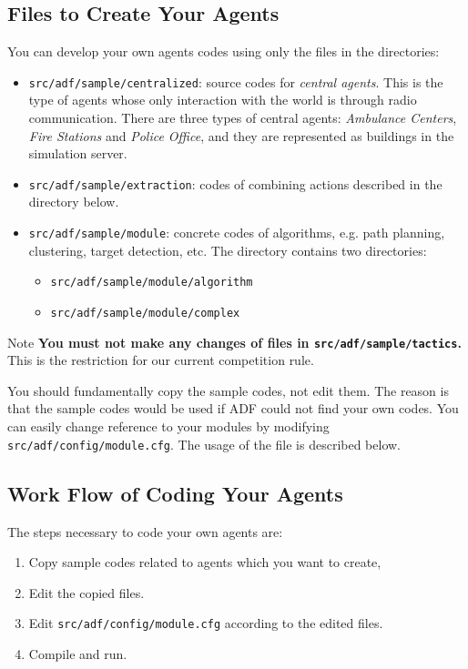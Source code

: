 \documentclass[a4paper]{article}
\begin{document}
\subsection{Files to Create Your Agents}
You can develop your own agents codes using only the files in the directories:
\begin{itemize}
 \item \texttt{src/adf/sample/centralized}: source codes for {\itshape central agents}. This is the type of agents whose only interaction with the world is through radio communication. There are three types of central agents: \textit{Ambulance Centers}, \textit{Fire Stations} and \textit{Police Office}, and they are represented as buildings in the simulation server.
 \item \texttt{src/adf/sample/extraction}: codes of combining actions described in the directory below.
 \item \texttt{src/adf/sample/module}: concrete codes of algorithms, e.g. path planning, clustering, target detection, etc. The directory contains two directories:
 \begin{itemize}
    \item \texttt{src/adf/sample/module/algorithm}
    \item \texttt{src/adf/sample/module/complex}
 \end{itemize}
\end{itemize}

\begin{itembox}[l]{Note}
{\bfseries You must not make any changes of files in \texttt{src/adf/sample/tactics}.} This is the restriction for our current competition rule.
\end{itembox}

You should fundamentally copy the sample codes, not edit them. The reason is that the sample codes would be used if ADF could not find your own codes. You can easily change reference to your modules by modifying \texttt{src/adf/config/module.cfg}. The usage of the file is described below.
\subsection{Work Flow of Coding Your Agents}
The steps necessary to code your own agents are:
\begin{enumerate}
 \item Copy sample codes related to agents which you want to create,
 \item Edit the copied files.
 \item Edit \texttt{src/adf/config/module.cfg} according to the edited files.
 \item Compile and run.
\end{enumerate}
\end{document}
